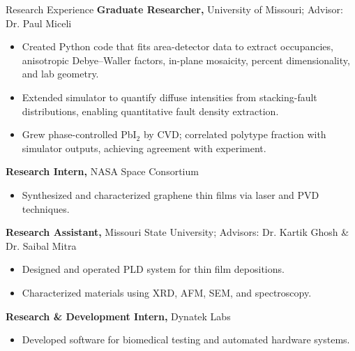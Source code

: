 \begin{rubric}{Research Experience}
    \entry*[2021 -- Present]%
        \textbf{Graduate Researcher,} University of Missouri; Advisor: Dr. Paul Miceli
        \begin{itemize}
            \item Created Python code that fits area-detector data to extract occupancies, anisotropic Debye--Waller factors, in-plane mosaicity, percent dimensionality, and lab geometry.
            \item Extended simulator to quantify diffuse intensities from stacking-fault distributions, enabling quantitative fault density extraction.
            \item Grew phase-controlled PbI$_2$ by CVD; correlated polytype fraction with simulator outputs, achieving agreement with experiment.
        \end{itemize}
    
    \entry*[2019 -- 2020]%
        \textbf{Research Intern,} NASA Space Consortium
        \begin{itemize}
            \item Synthesized and characterized graphene thin films via laser and PVD techniques.
        \end{itemize}
    
    \entry*[2017 -- 2020]%
        \textbf{Research Assistant,} Missouri State University; Advisors: Dr. Kartik Ghosh \& Dr. Saibal Mitra
        \begin{itemize}
            \item Designed and operated PLD system for thin film depositions.
            \item Characterized materials using XRD, AFM, SEM, and spectroscopy.
        \end{itemize}
    
    \entry*[2019]%
        \textbf{Research \& Development Intern,} Dynatek Labs
        \begin{itemize}
            \item Developed software for biomedical testing and automated hardware systems.
        \end{itemize}
\end{rubric}
